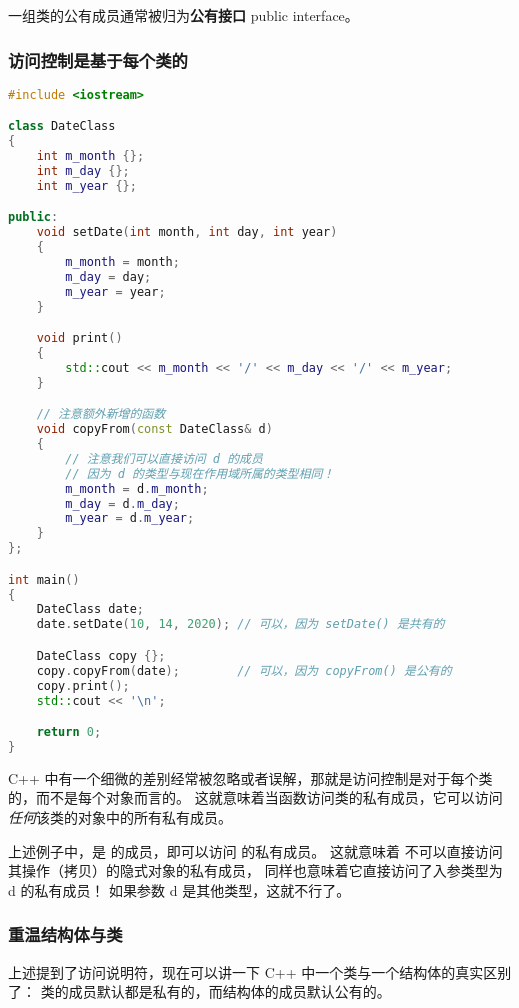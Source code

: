 \documentclass[../../LearnCpp.tex]{subfiles}
\begin{document}
一组类的公有成员通常被归为\textbf{公有接口} public interface。

\subsubsection*{访问控制是基于每个类的}

\begin{lstlisting}[language=C++]
#include <iostream>

class DateClass
{
    int m_month {};
    int m_day {};
    int m_year {};

public:
    void setDate(int month, int day, int year)
    {
        m_month = month;
        m_day = day;
        m_year = year;
    }

    void print()
    {
        std::cout << m_month << '/' << m_day << '/' << m_year;
    }

    // 注意额外新增的函数
    void copyFrom(const DateClass& d)
    {
        // 注意我们可以直接访问 d 的成员
        // 因为 d 的类型与现在作用域所属的类型相同！
        m_month = d.m_month;
        m_day = d.m_day;
        m_year = d.m_year;
    }
};

int main()
{
    DateClass date;
    date.setDate(10, 14, 2020); // 可以，因为 setDate() 是共有的

    DateClass copy {};
    copy.copyFrom(date);        // 可以，因为 copyFrom() 是公有的
    copy.print();
    std::cout << '\n';

    return 0;
}
\end{lstlisting}

C++ 中有一个细微的差别经常被忽略或者误解，那就是访问控制是对于每个类的，而不是每个对象而言的。
这就意味着当函数访问类的私有成员，它可以访问\textit{任何}该类的对象中的所有私有成员。

上述例子中，是 的成员，即可以访问 的私有成员。
这就意味着 不可以直接访问其操作（拷贝）的隐式对象的私有成员，
同样也意味着它直接访问了入参类型为 d 的私有成员！
如果参数 d 是其他类型，这就不行了。

\subsubsection*{重温结构体与类}

上述提到了访问说明符，现在可以讲一下 C++ 中一个类与一个结构体的真实区别了：
类的成员默认都是私有的，而结构体的成员默认公有的。
\end{document}
